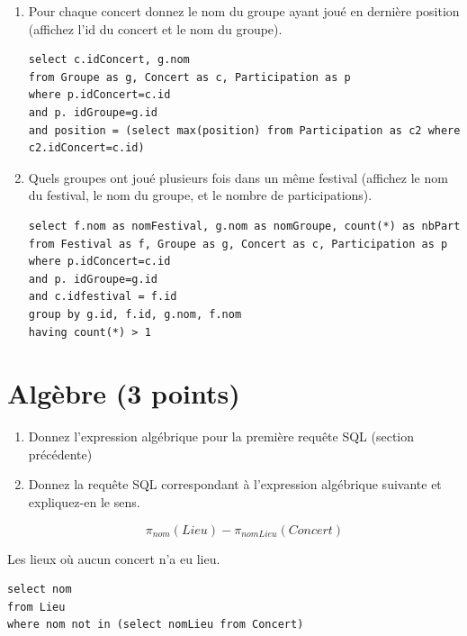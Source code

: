 \begin{enumerate}
\item Pour chaque concert donnez le nom du groupe ayant joué en dernière position (affichez l'id du concert
et le nom du groupe).

\begin{solution}
\begin{verbatim}
select c.idConcert, g.nom
from Groupe as g, Concert as c, Participation as p
where p.idConcert=c.id
and p. idGroupe=g.id
and position = (select max(position) from Participation as c2 where c2.idConcert=c.id)
\end{verbatim}
\end{solution}


\item Quels groupes ont joué plusieurs fois dans un même festival (affichez le nom
du festival, le nom du groupe, et le nombre de participations).

\begin{solution}
\begin{verbatim}
select f.nom as nomFestival, g.nom as nomGroupe, count(*) as nbPart
from Festival as f, Groupe as g, Concert as c, Participation as p
where p.idConcert=c.id
and p. idGroupe=g.id
and c.idfestival = f.id
group by g.id, f.id, g.nom, f.nom
having count(*) > 1
\end{verbatim}
\end{solution}
\end{enumerate}


\section{Algèbre (3 points)}

\begin{enumerate}
   \item Donnez l'expression algébrique pour la première requête SQL (section précédente)

   \item Donnez la requête SQL correspondant à l'expression algébrique suivante et expliquez-en le sens.

       $$\pi_{nom} (Lieu) - \pi_{nomLieu} (Concert)$$

\end{enumerate}


\begin{solution}

Les lieux où aucun concert n'a eu lieu.


\begin{verbatim}
select nom
from Lieu 
where nom not in (select nomLieu from Concert)
\end{verbatim}


\end{solution}



